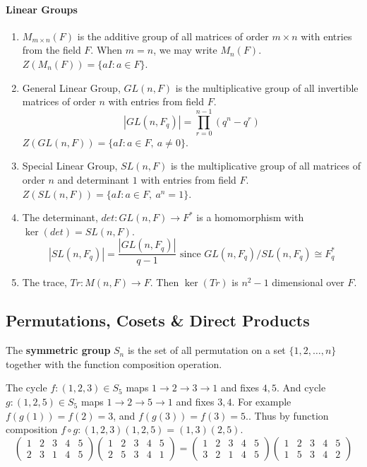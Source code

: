 \paragraph{Linear Groups}
\begin{enumerate}
	\item $M_{m \times n}(F)$ is the additive group of all matrices of order $m \times n$ with entries from the field $F$.
	When $m=n$, we may write $M_n(F)$.
	$Z(M_n(F)) = \{ aI : a \in F \}$.
	\item General Linear Group, $GL(n,F)$ is the multiplicative group of all invertible matrices of order $n$ with entries from field $F$.
	$$|GL(n,F_q)| = \prod_{r=0}^{n-1} (q^n-q^r)$$
	$Z(GL(n,F)) = \{ aI : a \in F,\ a \ne 0 \}$.
	\item Special Linear Group, $SL(n,F)$ is the multiplicative group of all matrices of order $n$ and determinant $1$ with entries from field $F$.
	$Z(SL(n,F)) = \{ aI : a \in F,\ a^n = 1 \}$.
	\item The determinant, $det : GL(n,F) \to F^\ast$ is a homomorphism with $\ker(det) = SL(n,F)$.
	$$|SL(n,F_q)| = \frac{|GL(n,F_q)|}{q-1} \text{ since } GL(n,F_q)/SL(n,F_q) \cong F_q^\ast$$
	\item The trace, $Tr : M(n,F) \to F$. Then $\ker(Tr)$ is $n^2-1$ dimensional over $F$.
\end{enumerate}

\subsection{Permutations, Cosets \& Direct Products}
\begin{definition}
	The \textbf{symmetric group} $S_n$ is the set of all permutation on a set $\{1,2,\dots,n\}$ together with the function composition operation.
\end{definition}

	The cycle $f: (1,2,3) \in S_5$ maps $1 \to 2 \to 3 \to 1$ and fixes $4,5$. And cycle $g:(1,2,5) \in S_5$ maps $1 \to 2 \to 5 \to 1$ and fixes $3,4$.
	For example $f(g(1)) = f(2) = 3$, and $f(g(3)) = f(3) = 5$..
	Thus by function composition $f \circ g : (1,2,3)(1,2,5) = (1,3)(2,5)$.
	$$ \begin{pmatrix} 1 & 2 & 3 & 4 & 5 \\ 2 & 3 & 1 & 4 & 5 \end{pmatrix} \begin{pmatrix} 1 & 2 & 3 & 4 & 5 \\ 2 & 5 & 3 & 4 & 1 \end{pmatrix} = \begin{pmatrix} 1 & 2 & 3 & 4 & 5 \\ 3 & 2 & 1 & 4 & 5 \end{pmatrix} \begin{pmatrix} 1 & 2 & 3 & 4 & 5 \\ 1 & 5 & 3 & 4 & 2 \end{pmatrix}$$

